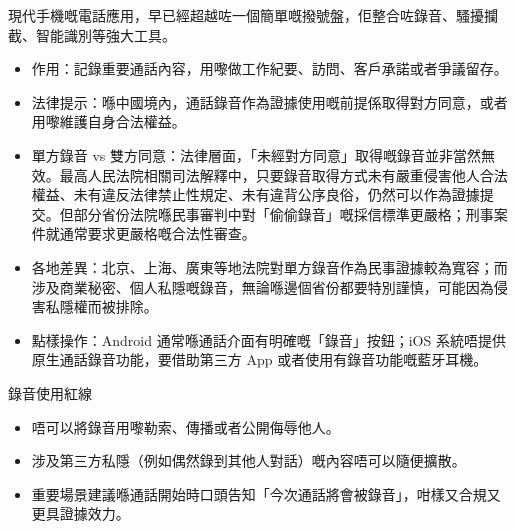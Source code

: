 


現代手機嘅電話應用，早已經超越咗一個簡單嘅撥號盤，佢整合咗錄音、騷擾攔截、智能識別等強大工具。


\begin{itemize}
  \item 作用：記錄重要通話內容，用嚟做工作紀要、訪問、客戶承諾或者爭議留存。
  \item 法律提示：喺中國境內，通話錄音作為證據使用嘅前提係取得對方同意，或者用嚟維護自身合法權益。
  \item 單方錄音 vs 雙方同意：法律層面，「未經對方同意」取得嘅錄音並非當然無效。最高人民法院相關司法解釋中，只要錄音取得方式未有嚴重侵害他人合法權益、未有違反法律禁止性規定、未有違背公序良俗，仍然可以作為證據提交。但部分省份法院喺民事審判中對「偷偷錄音」嘅採信標準更嚴格；刑事案件就通常要求更嚴格嘅合法性審查。
  \item 各地差異：北京、上海、廣東等地法院對單方錄音作為民事證據較為寬容；而涉及商業秘密、個人私隱嘅錄音，無論喺邊個省份都要特別謹慎，可能因為侵害私隱權而被排除。
  \item 點樣操作：Android 通常喺通話介面有明確嘅「錄音」按鈕；iOS 系統唔提供原生通話錄音功能，要借助第三方 App 或者使用有錄音功能嘅藍牙耳機。
\end{itemize}

\begin{tcbwarn}{錄音使用紅線}
\begin{itemize}
  \item 唔可以將錄音用嚟勒索、傳播或者公開侮辱他人。
  \item 涉及第三方私隱（例如偶然錄到其他人對話）嘅內容唔可以隨便擴散。
  \item 重要場景建議喺通話開始時口頭告知「今次通話將會被錄音」，咁樣又合規又更具證據效力。
\end{itemize}

\end{tcbwarn}



